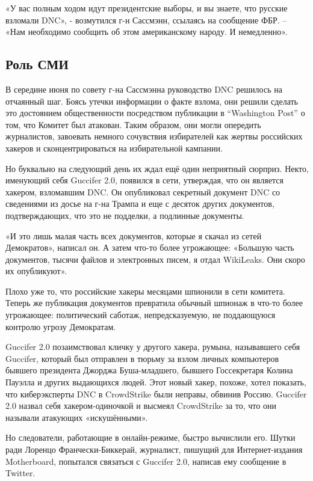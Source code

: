 «У вас полным ходом идут президентские выборы, и вы знаете, что русские
взломали DNC», - возмутился г-н Сассмэнн, ссылаясь на сообщение ФБР. --
«Нам необходимо сообщить об этом американскому народу. И немедленно».

\hypertarget{ux440ux43eux43bux44c-ux441ux43cux438}{%
\subsection{\texorpdfstring{\textbf{Роль
СМИ}}{Роль СМИ}}\label{ux440ux43eux43bux44c-ux441ux43cux438}}

В середине июня по совету г-на Сассмэнна руководство DNC решилось на
отчаянный шаг. Боясь утечки информации о факте взлома, они решили
сделать это достоянием общественности посредством публикации в
``Washington Post'' о том, что Комитет был атакован. Таким образом, они
могли опередить журналистов, завоевать немного сочувствия избирателей
как жертвы российских хакеров и сконцентрироваться на избирательной
кампании.

Но буквально на следующий день их ждал ещё один неприятный сюрприз.
Некто, именующий себя Guccifer 2.0, появился в сети, утверждая, что он
является хакером, взломавшим DNC. Он опубликовал секретный документ DNC
со сведениями из досье на г-на Трампа и еще с десяток других документов,
подтверждающих, что это не подделки, а подлинные документы.

«И это лишь малая часть всех документов, которые я скачал из сетей
Демократов», написал он. А затем что-то более угрожающее: «Большую часть
документов, тысячи файлов и электронных писем, я отдал WikiLeaks. Они
скоро их опубликуют».

Плохо уже то, что российские хакеры месяцами шпионили в сети комитета.
Теперь же публикация документов превратила обычный шпионаж в что-то
более угрожающее: политический саботаж, непредсказуемую, не поддающуюся
контролю угрозу Демократам.

Guccifer 2.0 позаимствовал кличку у другого хакера, румына, называвшего
себя Guccifer, который был отправлен в тюрьму за взлом личных
компьютеров бывшего президента Джорджа Буша-младшего, бывшего
Госсекретаря Колина Пауэлла и других выдающихся людей. Этот новый хакер,
похоже, хотел показать, что киберэксперты DNC в CrowdStrike были
неправы, обвинив Россию. Guccifer 2.0 назвал себя хакером-одиночкой и
высмеял CrowdStrike за то, что они называли атакующих «искушёнными».

Но следователи, работающие в онлайн-режиме, быстро вычислили его. Шутки
ради Лоренцо Франчески-Биккерай, журналист, пишущий для Интернет-издания
Motherboard, попытался связаться с Guccifer 2.0, написав ему сообщение в
Twitter.

